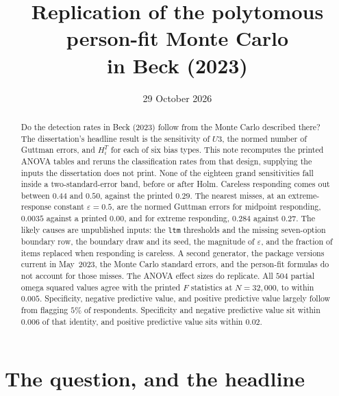 \documentclass[11pt]{article}
\title{Replication of the polytomous person-fit Monte Carlo\\
in Beck (2023)}
\author{}
\date{29 October 2026}
\begin{document}
\maketitle

\begin{abstract}
Do the detection rates in Beck (2023) follow from the Monte Carlo
described there?
The dissertation's headline result is the sensitivity of \(U3\), the
normed number of Guttman errors, and \(H_i^T\) for each of six bias
types.
This note recomputes the printed ANOVA tables and reruns the
classification rates from that design, supplying the inputs the
dissertation does not print.
None of the eighteen grand sensitivities fall inside a
two-standard-error band, before or after Holm.
Careless responding comes out between \(0.44\) and \(0.50\), against
the printed \(0.29\).
The nearest misses, at an extreme-response constant \(\varepsilon=0.5\),
are the normed Guttman errors for midpoint responding, \(0.0035\)
against a printed \(0.00\), and for extreme responding, \(0.284\)
against \(0.27\).
The likely causes are unpublished inputs: the \texttt{ltm} thresholds
and the missing seven-option boundary row, the boundary draw and its
seed, the magnitude of \(\varepsilon\), and the fraction of items
replaced when responding is careless.
A second generator, the package versions current in May~2023, the
Monte Carlo standard errors, and the person-fit formulas do not
account for those misses.
The ANOVA effect sizes do replicate.
All \(504\) partial omega squared values agree with the printed \(F\)
statistics at \(N=32{,}000\), to within \(0.005\).
Specificity, negative predictive value, and positive predictive value
largely follow from flagging \(5\%\) of respondents.
Specificity and negative predictive value sit within \(0.006\) of that
identity, and positive predictive value sits within \(0.02\).
\end{abstract}

\section{The question, and the headline}
\label{sec:headline}
\end{document}
